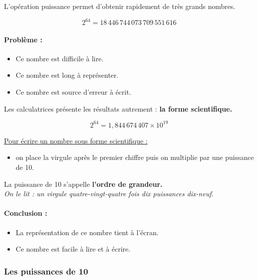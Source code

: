 \documentclass[12pt]{article}
\begin{document}
\begin{multicols}{2}

  L'opération puissance permet d'obtenir rapidement de très grands nombres.

  $$2^{64} = 18 \, 446 \, 744 \, 073 \, 709 \, 551 \, 616$$

  \paragraph{Problème :}

  \begin{itemize}
  \item Ce nombre est difficile à lire.
  \item Ce nombre est long à représenter.
  \item Ce nombre est source d'erreur à écrit.
  \end{itemize}

  Les calculatrices présente les résultats autrement : \textbf{la forme scientifique.}

  $$2^{64} = 1,844 \, 674 \, 407 \times 10^{19}$$

  \underline{Pour écrire un nombre sous forme scientifique :} \\
  \begin{itemize}
  \item on place la virgule après le premier chiffre puis on multiplie par une puissance de 10. \\
  \end{itemize}

  La puissance de 10 s'appelle \textbf{l'ordre de grandeur.}\\
  \textit{On le lit : un virgule quatre-vingt-quatre fois dix puissances dix-neuf.}

  \paragraph{Conclusion :}

  \begin{itemize}
  \item La représentation de ce nombre tient à l'écran.
  \item Ce nombre est facile à lire et à écrire.
  \end{itemize}

  \subsubsection*{Les puissances de 10}


\end{multicols}
\end{document}

